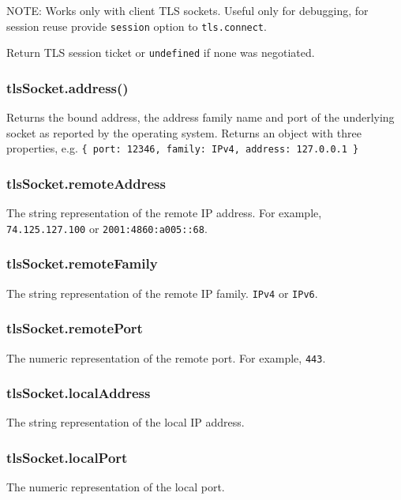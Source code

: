 NOTE: Works only with client TLS sockets. Useful only for debugging, for
session reuse provide \texttt{session} option to \texttt{tls.connect}.

Return TLS session ticket or \texttt{undefined} if none was negotiated.

\subsubsection{tlsSocket.address()}\label{tlssocket.address}

Returns the bound address, the address family name and port of the
underlying socket as reported by the operating system. Returns an object
with three properties, e.g.
\texttt{\{\ port:\ 12346,\ family:\ \textquotesingle{}IPv4\textquotesingle{},\ address:\ \textquotesingle{}127.0.0.1\textquotesingle{}\ \}}

\subsubsection{tlsSocket.remoteAddress}\label{tlssocket.remoteaddress}

The string representation of the remote IP address. For example,
\texttt{\textquotesingle{}74.125.127.100\textquotesingle{}} or
\texttt{\textquotesingle{}2001:4860:a005::68\textquotesingle{}}.

\subsubsection{tlsSocket.remoteFamily}\label{tlssocket.remotefamily}

The string representation of the remote IP family.
\texttt{\textquotesingle{}IPv4\textquotesingle{}} or
\texttt{\textquotesingle{}IPv6\textquotesingle{}}.

\subsubsection{tlsSocket.remotePort}\label{tlssocket.remoteport}

The numeric representation of the remote port. For example,
\texttt{443}.

\subsubsection{tlsSocket.localAddress}\label{tlssocket.localaddress}

The string representation of the local IP address.

\subsubsection{tlsSocket.localPort}\label{tlssocket.localport}

The numeric representation of the local port.
